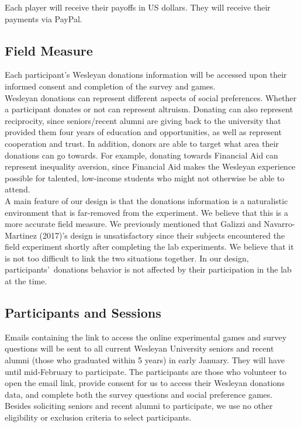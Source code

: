 \documentclass{article}
\begin{document}
Each player will receive their payoffs in US dollars. They will receive their payments via PayPal.


\subsection{Field Measure}

Each participant\rq s Wesleyan donations information will be accessed upon their informed consent and completion of the survey and games. \\

Wesleyan donations can represent different aspects of social preferences. Whether a participant donates or not can represent altruism. Donating can also represent reciprocity, since seniors/recent alumni are giving back to the university that provided them four years of education and opportunities, as well as represent cooperation and trust. In addition, donors are able to target what area their donations can go towards. For example, donating towards Financial Aid can represent inequality aversion, since Financial Aid makes the Wesleyan experience possible for talented, low-income students who might not otherwise be able to attend.  \\

	A main feature of our design is that the donations information is a naturalistic environment that is far-removed from the experiment. We believe that this is a more accurate field measure. We previously mentioned that Galizzi and Navarro-Martinez (2017)\rq s design is unsatisfactory since their subjects encountered the field experiment shortly after completing the lab experiments. We believe that it is not too difficult to link the two situations together. In our design, participants\rq \ donations behavior is not affected by their participation in the lab at the time.
	
\subsection{Participants and Sessions}
Emails containing the link to access the online experimental games and survey questions will be sent to all current Wesleyan University seniors and recent alumni (those who graduated within 5 years) in early January. They will have until mid-February to participate. The participants are those who volunteer to open the email link, provide consent for us to access their Wesleyan donations data, and complete both the survey questions and social preference games. Besides soliciting seniors and recent alumni to participate, we use no other eligibility or exclusion criteria to select participants.
\end{document}
